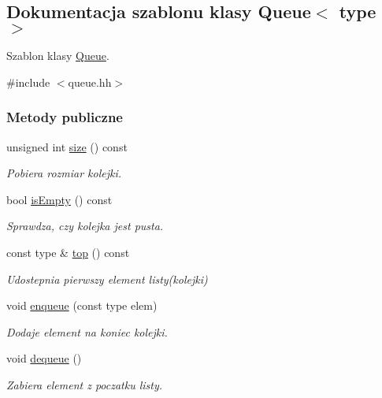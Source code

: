 \hypertarget{class_queue}{\subsection{Dokumentacja szablonu klasy Queue$<$ type $>$}
\label{class_queue}
}


Szablon klasy \hyperlink{class_queue}{Queue}.  




{\ttfamily \#include $<$queue.\-hh$>$}

\subsubsection*{Metody publiczne}
\begin{DoxyCompactItemize}
\item 
unsigned int \hyperlink{class_queue_a9c190e4f0881a20d985844ffd6295698}{size} () const 
\begin{DoxyCompactList}\small\item\em Pobiera rozmiar kolejki. \end{DoxyCompactList}\item 
bool \hyperlink{class_queue_a33f9556d156d041eedb7907f1bf22ede}{is\-Empty} () const 
\begin{DoxyCompactList}\small\item\em Sprawdza, czy kolejka jest pusta. \end{DoxyCompactList}\item 
const type \& \hyperlink{class_queue_aed6772796309d05cb0a00a96f47d8ff0}{top} () const 
\begin{DoxyCompactList}\small\item\em Udostepnia pierwszy element listy(kolejki) \end{DoxyCompactList}\item 
void \hyperlink{class_queue_a3b443b419202c56cf801958f88d453e0}{enqueue} (const type elem)
\begin{DoxyCompactList}\small\item\em Dodaje element na koniec kolejki. \end{DoxyCompactList}\item 
void \hyperlink{class_queue_a95271aa91a420af3e4eeaaeed6b3b0a0}{dequeue} ()
\begin{DoxyCompactList}\small\item\em Zabiera element z poczatku listy. \end{DoxyCompactList}\end{DoxyCompactItemize}
